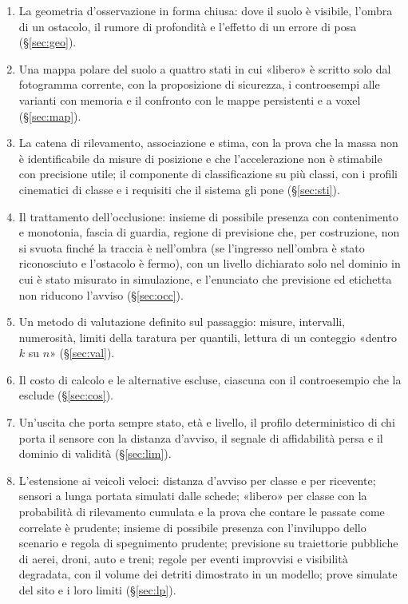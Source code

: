 \begin{enumerate}[label=\arabic*.]
\item La geometria d'osservazione in forma chiusa: dove il suolo è visibile, l'ombra di un ostacolo, il rumore di profondità e l'effetto di un errore di posa (\S\ref{sec:geo}).
\item Una mappa polare del suolo a quattro stati in cui «libero» è scritto solo dal fotogramma corrente, con la proposizione di sicurezza, i controesempi alle varianti con memoria e il confronto con le mappe persistenti e a voxel (\S\ref{sec:map}).
\item La catena di rilevamento, associazione e stima, con la prova che la massa non è identificabile da misure di posizione e che l'accelerazione non è stimabile con precisione utile; il componente di classificazione su più classi, con i profili cinematici di classe e i requisiti che il sistema gli pone (\S\ref{sec:sti}).
\item Il trattamento dell'occlusione: insieme di possibile presenza con contenimento e monotonia, fascia di guardia, regione di previsione che, per costruzione, non si svuota finché la traccia è nell'ombra (se l'ingresso nell'ombra è stato riconosciuto e l'ostacolo è fermo), con un livello dichiarato solo nel dominio in cui è stato misurato in simulazione, e l'enunciato che previsione ed etichetta non riducono l'avviso (\S\ref{sec:occ}).
\item Un metodo di valutazione definito sul passaggio: misure, intervalli, numerosità, limiti della taratura per quantili, lettura di un conteggio «dentro $k$ su $n$» (\S\ref{sec:val}).
\item Il costo di calcolo e le alternative escluse, ciascuna con il controesempio che la esclude (\S\ref{sec:cos}).
\item Un'uscita che porta sempre stato, età e livello, il profilo deterministico di chi porta il sensore con la distanza d'avviso, il segnale di affidabilità persa e il dominio di validità (\S\ref{sec:lim}).
\item L'estensione ai veicoli veloci: distanza d'avviso per classe e per ricevente; sensori a lunga portata simulati dalle schede; «libero» per classe con la probabilità di rilevamento cumulata e la prova che contare le passate come correlate è prudente; insieme di possibile presenza con l'inviluppo dello scenario e regola di spegnimento prudente; previsione su traiettorie pubbliche di aerei, droni, auto e treni; regole per eventi improvvisi e visibilità degradata, con il volume dei detriti dimostrato in un modello; prove simulate del sito e i loro limiti (\S\ref{sec:lp}).

\end{enumerate}
